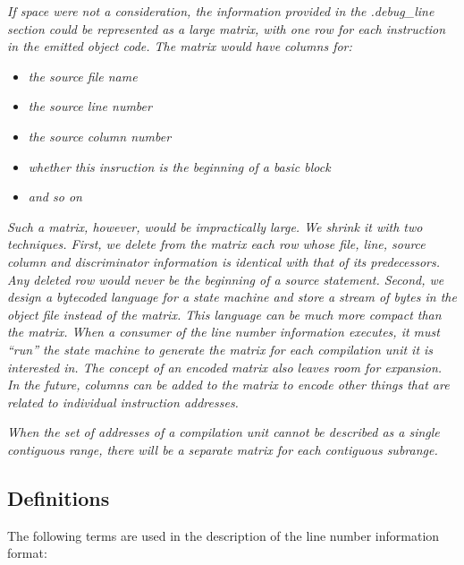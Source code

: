 \textit{If space were not a consideration, the information provided
in the .debug\_line section could be represented as a large
matrix, with one row for each instruction in the emitted
object code. The matrix would have columns for:}

\begin{itemize}
\item \textit{the source file name}
\item \textit{the source line number}
\item \textit{the source column number}
\item \textit{whether this insruction is the beginning of a basic block}
\item \textit{and so on}
\end{itemize}

\textit{Such a matrix, however, would be impractically large. We
shrink it with two techniques. First, we delete from
the matrix each row whose file, line, source column and
discriminator information is identical with that of its
predecessors. Any deleted row would never be the beginning of
a source statement. Second, we design a byte\dash coded language
for a state machine and store a stream of bytes in the object
file instead of the matrix. This language can be much more
compact than the matrix. When a consumer of the line number
information executes, it must ``run'' the state machine
to generate the matrix for each compilation unit it is
interested in.  The concept of an encoded matrix also leaves
room for expansion. In the future, columns can be added to the
matrix to encode other things that are related to individual
instruction addresses.}

\textit{When the set of addresses of a compilation unit cannot be
described as a single contiguous range, there will be a
separate matrix for each contiguous subrange.}

\subsection{Definitions}

The following terms are used in the description of the line
number information format:


